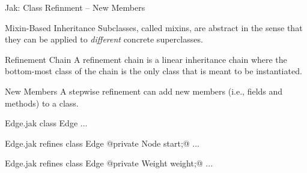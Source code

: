 \begin{frame}[fragile]{Jak: Class Refinment – New Members}
	\vspace{-1.5cm}\begin{flushright}\end{flushright}
	\begin{mycolumns}[widths={50,50},animation=none]
		\begin{definition}{Mixin-Based Inheritance}
			Subclasses, called mixins, are abstract in the sense that they can be applied to \emph{different} concrete superclasses.
		\end{definition}
		\begin{definition}{Refinement Chain}
			A refinement chain is a linear inheritance chain where the bottom-most class of the chain is the only class that is meant to be instantiated.
		\end{definition}
		\begin{definition}{New Members}
			A stepwise refinement can add new members (i.e., fields and methods) to a class.
		\end{definition}
	\mynextcolumn
{\small
\begin{codetight}{Edge.jak}
class Edge {
	...
}
\end{codetight}
\begin{codetight}{Edge.jak}
refines class Edge {
	@private Node start;@
	...
}
\end{codetight}
\begin{codetight}{Edge.jak}
refines class Edge {
	@private Weight weight;@
	...
}
\end{codetight}
}
	\end{mycolumns}
\end{frame}

